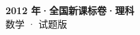 \documentclass[zihao=-4, a4paper]{ctexart}
\begin{document}
\begin{center}
  {\Large\bfseries 2012 年·全国新课标卷·理科}\\[4pt]
  {\large 数学 · 试题版}
\end{center}
\medskip
{}

\end{document}
